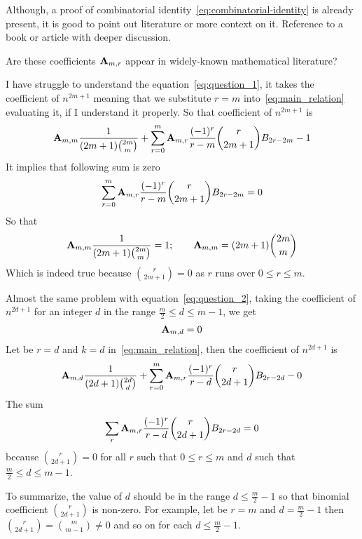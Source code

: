 \begin{question}
    Although, a proof of combinatorial identity~\eqref{eq:combinatorial-identity} is already present, it is good
    to point out literature or more context on it.
    Reference to a book or article with deeper discussion.
\end{question}
\begin{question}
    Are these coefficients ${\mathbf{A}} \sb{m,r}$ appear in widely-known mathematical literature?
\end{question}
\begin{question}
    \label{eq:question_2}
    I have struggle to understand the equation~\eqref{eq:question_1}, it takes the coefficient of $n^{2m+1}$ meaning that
    we substitute $r=m$ into~\eqref{eq:main_relation} evaluating it, if I understand it properly.
    So that coefficient of $n^{2m+1}$ is
    \begin{align*}
        {\mathbf{A}} \sb{m,m} \frac{1}{(2m+1) \binom{2m}{m}} + \sum_{r=0}^{m} {\mathbf{A}} \sb{m,r} \frac{(-1)^r}{r-m} \binom{r}{2m+1} {B}\sb{2r-2m} - 1
    \end{align*}
    It implies that following sum is zero
    \begin{align*}
         \sum_{r=0}^{m} {\mathbf{A}} \sb{m,r} \frac{(-1)^r}{r-m} \binom{r}{2m+1} {B}\sb{2r-2m} = 0
    \end{align*}
    So that
    \begin{align*}
        {\mathbf{A}} \sb{m,m} \frac{1}{(2m+1) \binom{2m}{m}} = 1; \quad \quad {\mathbf{A}} \sb{m,m} = (2m+1) \binom{2m}{m}
    \end{align*}
    Which is indeed true because $\binom{r}{2m+1} = 0$ as $r$ runs over $0 \leq r \leq m$.
\end{question}
\begin{question}
    Almost the same problem with equation~\eqref{eq:question_2},
    taking the coefficient of $n^{2d+1}$ for an integer $d$ in the range $\frac{m}{2} \leq d \leq m-1$, we get
    \begin{align*}
        {\mathbf{A}} \sb{m,d} = 0
    \end{align*}
    Let be $r=d$ and $k=d$ in~\eqref{eq:main_relation}, then the coefficient of $n^{2d+1}$ is
    \begin{align*}
        {\mathbf{A}} \sb{m,d} \frac{1}{(2d+1) \binom{2d}{d}} + \sum_{r=0}^{m} {\mathbf{A}} \sb{m,r} \frac{(-1)^r}{r-d} \binom{r}{2d+1} {B}\sb{2r-2d} - 0
    \end{align*}
    The sum
    \begin{align*}
        \sum_{r} {\mathbf{A}} \sb{m,r} \frac{(-1)^r}{r-d} \binom{r}{2d+1} {B}\sb{2r-2d} = 0
    \end{align*}
    because $\binom{r}{2d+1}=0$ for all $r$ such that $0 \leq r \leq m$ and $d$ such that $\frac{m}{2} \leq d \leq m-1$.
\end{question}
To summarize, the value of $d$ should be in the range $d \leq \frac{m}{2}-1$ so that binomial coefficient $\binom{r}{2d+1}$
is non-zero.
For example, let be $r=m$ and $d=\frac{m}{2}-1$ then $\binom{r}{2d+1} = \binom{m}{m-1} \neq 0$ and so on for each $d \leq \frac{m}{2}-1$.
